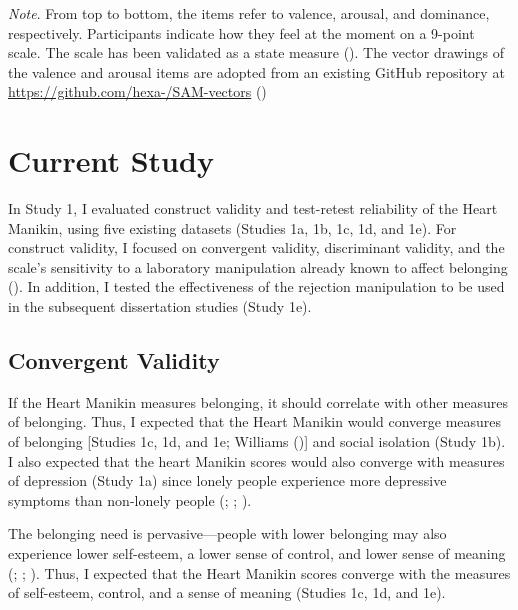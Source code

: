 \documentclass[
]{udthesis}
\begin{document}
\emph{Note}. From top to bottom, the items refer to valence, arousal, and
dominance, respectively. Participants indicate how they feel at the
moment on a 9-point scale. The scale has been validated as a state
measure (). The vector drawings of the valence and arousal
items are adopted from an existing GitHub repository at
\url{https://github.com/hexa-/SAM-vectors} ()

\section{Current Study}\label{current-study}

In Study 1, I evaluated construct validity and test-retest reliability
of the Heart Manikin, using five existing datasets (Studies 1a, 1b, 1c,
1d, and 1e). For construct validity, I focused on convergent validity,
discriminant validity, and the scale's sensitivity to a laboratory
manipulation already known to affect belonging (). In
addition, I tested the effectiveness of the rejection manipulation to be
used in the subsequent dissertation studies (Study 1e).

\subsection{Convergent Validity}\label{convergent-validity}

If the Heart Manikin measures belonging, it should correlate with other
measures of belonging. Thus, I expected that the Heart Manikin would
converge measures of belonging {[}Studies 1c, 1d, and 1e; Williams (){]} and social isolation
(Study 1b). I also expected that the heart Manikin scores would also converge
with measures of depression (Study 1a) since lonely people experience
more depressive symptoms than non-lonely people (; ; ).

The belonging need is pervasive---people with lower belonging may also
experience lower self-esteem, a lower sense of control, and lower
sense of meaning (; ; ). Thus, I expected
that the Heart Manikin scores converge with the measures of self-esteem,
control, and a sense of meaning (Studies 1c, 1d, and 1e).
\end{document}

